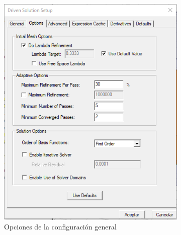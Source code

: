 \begin{figure}[p]
     \centering
     \begin{subfigure}[b]{0.48\textwidth}
         \centering
         \includegraphics[width=\textwidth]{archivos/desarrollo/9a}
         \caption{Opciones de la configuración general}
         \label{fig:configa}
     \end{subfigure}
     \hfill
     \begin{subfigure}[b]{0.48\textwidth}
         \centering

\end{subfigure}
\end{figure}
